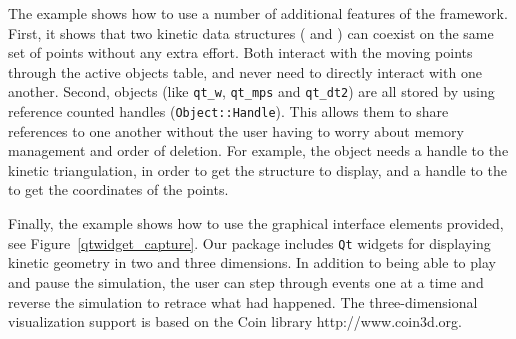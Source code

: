 The example shows how to use a number of additional features of the
framework. First, it shows that two kinetic data structures
( and
) can coexist on the same set of
points without any extra effort. Both interact with the moving points
through the active objects table, and never need to directly interact
with one another. Second, objects (like
\texttt{qt\_w}, \texttt{qt\_mps} and \texttt{qt\_dt2}) are all stored
by using reference counted handles (\texttt{Object::Handle}). This
allows them to share references to one another without the user having
to worry about memory management and order of deletion.  For example,
the  object needs a handle to the kinetic
triangulation, in order to get the structure to display, and a handle
to the  to get the coordinates of the
points.


Finally, the example shows how to use the graphical interface elements
provided, see Figure~\ref{qtwidget_capture}. Our package includes
\texttt{Qt} widgets for displaying kinetic geometry in two and three
dimensions. In addition to being able to play and pause the
simulation, the user can step through events one at a time and reverse
the simulation to retrace what had happened. The three-dimensional
visualization support is based on the Coin library http://www.coin3d.org.

